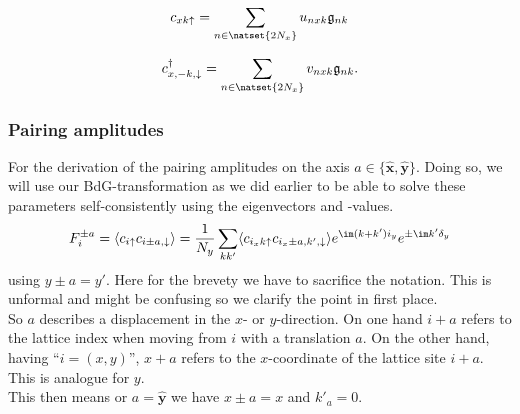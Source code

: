 \documentclass[../main.tex]{subfile}
\begin{document}
\begin{center}
    \begin{minipage}{0.4\textwidth}
    \begin{equation}\label{eq:BdG_transf_c_fourier}
        c_{xk\uparrow} = \sum_{n\in\natset{2N_x}} u_{nxk}\mathfrak{g}_{nk} 
    \end{equation}
    \end{minipage}\hspace{0.05\textwidth}
    \begin{minipage}{0.03\textwidth}
    \end{minipage}
    \begin{minipage}{0.45\textwidth}
        \begin{equation}
        \label{eq:BdG_transf_c_fourier_dagg}
            c_{x,-k,\downarrow}^{\dagger} =\sum_{n\in\natset{2N_x}} v_{nxk}\mathfrak{g}_{nk}. 
        \end{equation}
    \end{minipage}
    \end{center}

\subsubsection{Pairing amplitudes}
For the derivation of the pairing amplitudes on the axis $a\in\{\hat{\bm{x}},\hat{\bm{y}}\}$.
Doing so, we will use our BdG-transformation as we did earlier to be 
able to solve these parameters self-consistently using the eigenvectors and -values.\\

\begin{equation*}
    F_i^{\pm a} = \langle c_{i\uparrow} c_{i\pm a,\downarrow}\rangle =
    \frac{1}{N_y} \sum_{kk'} \langle c_{i_x k\uparrow} c_{i_x\pm a,k',\downarrow} \rangle e^{\im(k + k')i_y} e^{\pm\im k' \delta_y}
\end{equation*}
using $y\pm a = y'$. Here for the brevety we have to sacrifice the notation. This is unformal and might be confusing so we clarify the point in first place.\\
So $a$ describes a displacement in the $x$- or $y$-direction. On one hand $i+a$ refers to 
the lattice index when moving from $i$ with a translation $a$. On the other hand, having ``$i = (x,y)$'', $x+a$ refers to the $x$-coordinate of the lattice site $i+a$.
This is analogue for $y$.\\ 
This then means or $a= \hat{\bm{y}}$ we have $x\pm a = x$ and $k'_a = 0$.\\
\end{document}
